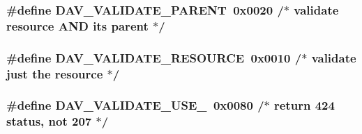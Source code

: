 \subsubsection[{\texorpdfstring{D\+A\+V\+\_\+\+V\+A\+L\+I\+D\+A\+T\+E\+\_\+\+P\+A\+R\+E\+NT}{DAV_VALIDATE_PARENT}}]{\setlength{\rightskip}{0pt plus 5cm}\#define D\+A\+V\+\_\+\+V\+A\+L\+I\+D\+A\+T\+E\+\_\+\+P\+A\+R\+E\+NT~0x0020  /$\ast$ validate resource A\+N\+D its parent $\ast$/}\hypertarget{group__MOD__DAV_gab881116857faf5b971cdab252ae8b51c}{}\label{group__MOD__DAV_gab881116857faf5b971cdab252ae8b51c}
\subsubsection[{\texorpdfstring{D\+A\+V\+\_\+\+V\+A\+L\+I\+D\+A\+T\+E\+\_\+\+R\+E\+S\+O\+U\+R\+CE}{DAV_VALIDATE_RESOURCE}}]{\setlength{\rightskip}{0pt plus 5cm}\#define D\+A\+V\+\_\+\+V\+A\+L\+I\+D\+A\+T\+E\+\_\+\+R\+E\+S\+O\+U\+R\+CE~0x0010  /$\ast$ validate just the resource $\ast$/}\hypertarget{group__MOD__DAV_ga08f6721df6fb55b118a54def82007a8c}{}\label{group__MOD__DAV_ga08f6721df6fb55b118a54def82007a8c}
\subsubsection[{\texorpdfstring{D\+A\+V\+\_\+\+V\+A\+L\+I\+D\+A\+T\+E\+\_\+\+U\+S\+E\+\_\+424}{DAV_VALIDATE_USE_424}}]{\setlength{\rightskip}{0pt plus 5cm}\#define D\+A\+V\+\_\+\+V\+A\+L\+I\+D\+A\+T\+E\+\_\+\+U\+S\+E\+\_~0x0080  /$\ast$ return 424 status, not 207 $\ast$/}\hypertarget{group__MOD__DAV_ga9bbe244391cc0a4022c33c6fec937920}{}\label{group__MOD__DAV_ga9bbe244391cc0a4022c33c6fec937920}
